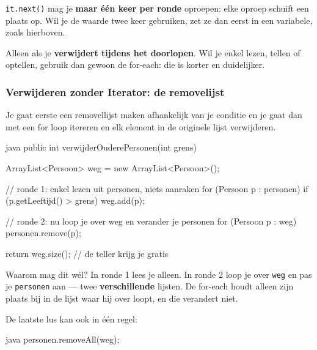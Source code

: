 \documentclass[a4paper,11pt]{article}
\begin{document}
\begin{warningbox}
    \texttt{it.next()} mag je \textbf{maar \'e\'en keer per ronde} oproepen: elke
    oproep schuift een plaats op. Wil je de waarde twee keer gebruiken, zet ze dan
    eerst in een variabele, zoals hierboven.
\end{warningbox}

\begin{conceptbox}
    Alleen als je \textbf{verwijdert tijdens het doorlopen}. Wil je enkel lezen,
    tellen of optellen, gebruik dan gewoon de for-each: die is korter en duidelijker.
\end{conceptbox}

\subsubsection{Verwijderen zonder Iterator: de removelijst}

Je gaat eerste een removellijst maken afhankelijk van je conditie en je gaat dan met een
for loop itereren en elk element in de originele lijst verwijderen.

\begin{codeblock}{java}
    public int verwijderOuderePersonen(int grens)
    {
            ArrayList<Persoon> weg = new ArrayList<Persoon>();

            // ronde 1: enkel lezen uit personen, niets aanraken
            for (Persoon p : personen)
            {
                    if (p.getLeeftijd() > grens)
                    {
                            weg.add(p);
                        }
                }

            // ronde 2: nu loop je over weg en verander je personen
            for (Persoon p : weg)
            {
                    personen.remove(p);
                }

            return weg.size();   // de teller krijg je gratis
        }
\end{codeblock}

Waarom mag dit w\'el? In ronde 1 lees je alleen. In ronde 2 loop je over
\texttt{weg} en pas je \texttt{personen} aan --- twee \textbf{verschillende}
lijsten. De for-each houdt alleen zijn plaats bij in de lijst waar hij over
loopt, en die verandert niet.

De laatste lus kan ook in \'e\'en regel:

\begin{codeblock}[Korter]{java}
    personen.removeAll(weg);
\end{codeblock}
\end{document}
